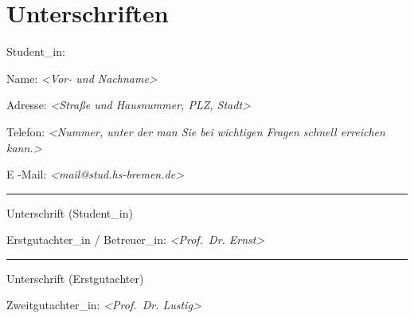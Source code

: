 \documentclass[11pt]{scrartcl}
\begin{document}
\section{Unterschriften}

Student\_in:

 Name: \textit{<Vor- und Nachname>}
 
 Adresse: \textit{<Straße und Hausnummer, PLZ, Stadt>}
 
 Telefon: \textit{<Nummer, unter der man Sie bei wichtigen Fragen schnell erreichen kann.>}
  
 E -Mail: \textit{<mail@stud.hs-bremen.de>}


 \hfill \rule{7cm}{0.2mm}

 \hfill Unterschrift (Student\_in)
 
\noindent
Erstgutachter\_in / Betreuer\_in: \textit{<Prof.~Dr. Ernst>} \\[0.2cm]

 \hfill \rule{7cm}{0.2mm}

 \hfill Unterschrift (Erstgutachter)


\noindent
Zweitgutachter\_in: \textit{<Prof.~Dr. Lustig>}




% 
%
%
% 



\printbibheading
\printbibliography[nottype=online, heading=subbibliography, title={Gedruckte Quellen}]
\printbibliography[type=online, heading=subbibliography, title={Online Quellen}]
\end{document}

